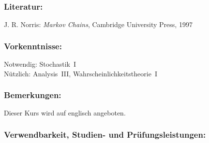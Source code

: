 \documentclass[a4paper,10pt]{article}
\begin{document}
\subsubsection*{\large
    Literatur:
}
J. R. Norris: \emph{Markov Chains}, Cambridge University Press, 1997
\subsubsection*{\large
    Vorkenntnisse:
}
Notwendig: Stochastik~I \\
Nützlich: Analysis~III,  Wahrscheinlichkeitstheorie~I
\subsubsection*{\large
    Bemerkungen:
}
Dieser Kurs wird auf englisch angeboten.
\subsubsection*{\large
    Verwendbarkeit, Studien- und Prüfungsleistungen:
}
\end{document}
